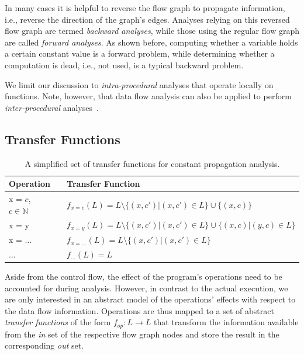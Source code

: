 In many cases it is helpful to reverse the flow graph to propagate information,
i.e., reverse the direction of the graph's edges. Analyses relying on this
reversed flow graph are termed \emph{backward analyses}, while those using the
regular flow graph are called \emph{forward analyses}. As shown before,
computing whether a variable holds a certain constant value is a forward
problem, while determining whether a computation is dead, i.e., not used, is a
typical backward problem.

We limit our discussion to \emph{intra-procedural} analyses that operate locally
on functions. Note, however, that data flow analysis can also be applied to
perform \emph{inter-procedural} analyses~\cite{novillo:bib:NNH99}.

\subsection{Transfer Functions}

\begin{table}[t]
  \begin{center}
    \begin{tabular}{lp{8mm}l}
      Operation                   & & Transfer Function                      \\ \hline
      x = $c$, $c \in \mathbb{N}$ & & $f_{x=c}(L) = L \setminus \{ (x, c') | (x, c') \in L \} \cup \{ (x, c) \}$ \\
      x = y                       & & $f_{x=y}(L) = L \setminus \{ (x, c') | (x, c') \in L \} \cup \{ (x, c) | (y,c) \in L\}$ \\
      x = $\ldots$                & & $f_{x=\ldots}(L) = L \setminus \{ (x, c') | (x, c') \in L \}$ \\
      $\ldots$                    & & $f_{\ldots}(L) = L$ \\ \hline
    \end{tabular}
  \end{center}
  \caption{A simplified set of transfer functions for constant propagation
           analysis.}
  \label{novillo:fig:transfer_functions}
\end{table}

Aside from the control flow, the effect of the program's operations
need to be accounted for during analysis. However, in contrast to the actual
execution, we are only interested in an abstract model of the operations'
effects with respect to the data flow information. Operations are thus mapped to
a set of abstract \emph{transfer functions} of the form $f_{op}: L \rightarrow
L$ that transform the information available from the \emph{in} set of the
respective flow graph nodes and store the result in the corresponding \emph{out}
set.

